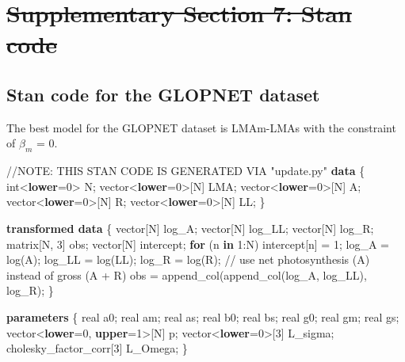 \documentclass[
  12pt,
  letterpaper,
  DIV=11,
  numbers=noendperiod]{scrartcl}
\newenvironment{Shaded}{\begin{snugshade}}{\end{snugshade}}
\newcommand{\AlertTok}[1]{\textcolor[rgb]{0.68,0.00,0.00}{#1}}
\newcommand{\CommentTok}[1]{\textcolor[rgb]{0.37,0.37,0.37}{#1}}
\newcommand{\ControlFlowTok}[1]{\textcolor[rgb]{0.00,0.23,0.31}{\textbf{#1}}}
\newcommand{\DataTypeTok}[1]{\textcolor[rgb]{0.68,0.00,0.00}{#1}}
\newcommand{\DecValTok}[1]{\textcolor[rgb]{0.68,0.00,0.00}{#1}}
\newcommand{\KeywordTok}[1]{\textcolor[rgb]{0.00,0.23,0.31}{\textbf{#1}}}
\newcommand{\NormalTok}[1]{\textcolor[rgb]{0.00,0.23,0.31}{#1}}
\numberwithin{equation}{section} %
\providecommand{\DIFdel}[1]{{\protect\color{red}\sout{#1}}}                      %
\providecommand{\DIFaddbegin}{} %
\providecommand{\DIFaddend}{} %
\providecommand{\DIFdelend}{} %
\newcommand{\DIFaddincludegraphics}[2][]{{\color{blue}\fbox{\DIFOincludegraphics[#1]{#2}}}} %
\DeclareRobustCommand{\DIFaddbegin}{\DIFOaddbegin \let\includegraphics\DIFaddincludegraphics} %
\DeclareRobustCommand{\DIFaddend}{\DIFOaddend \let\includegraphics\DIFOincludegraphics} %
\DeclareRobustCommand{\DIFdelend}{\DIFOaddend \let\includegraphics\DIFOincludegraphics} %
\begin{document}
\section{\DIFdel{Supplementary Section 7: Stan
code}}%
\addtocounter{section}{-1}%
\DIFdelend \DIFaddbegin \label{stan-code}
\DIFaddend 

\subsection{Stan code for the GLOPNET
dataset}\label{stan-code-for-the-glopnet-dataset}

The best model for the GLOPNET dataset is LMAm-LMAs with the constraint
of \(\beta_m\) = 0.

\begin{Shaded}
\begin{Highlighting}[]
\CommentTok{//}\AlertTok{NOTE}\CommentTok{: THIS STAN CODE IS GENERATED VIA "update.py"}
\KeywordTok{data}\NormalTok{ \{}
  \DataTypeTok{int}\NormalTok{\textless{}}\KeywordTok{lower}\NormalTok{=}\DecValTok{0}\NormalTok{\textgreater{} N;}
  \DataTypeTok{vector}\NormalTok{\textless{}}\KeywordTok{lower}\NormalTok{=}\DecValTok{0}\NormalTok{\textgreater{}[N] LMA;}
  \DataTypeTok{vector}\NormalTok{\textless{}}\KeywordTok{lower}\NormalTok{=}\DecValTok{0}\NormalTok{\textgreater{}[N] A;}
  \DataTypeTok{vector}\NormalTok{\textless{}}\KeywordTok{lower}\NormalTok{=}\DecValTok{0}\NormalTok{\textgreater{}[N] R;}
  \DataTypeTok{vector}\NormalTok{\textless{}}\KeywordTok{lower}\NormalTok{=}\DecValTok{0}\NormalTok{\textgreater{}[N] LL;}
\NormalTok{\}}

\KeywordTok{transformed data}\NormalTok{ \{}
  \DataTypeTok{vector}\NormalTok{[N] log\_A;}
  \DataTypeTok{vector}\NormalTok{[N] log\_LL;}
  \DataTypeTok{vector}\NormalTok{[N] log\_R;}
  \DataTypeTok{matrix}\NormalTok{[N, }\DecValTok{3}\NormalTok{] obs;}
  \DataTypeTok{vector}\NormalTok{[N] intercept;}
  \ControlFlowTok{for}\NormalTok{ (n }\ControlFlowTok{in} \DecValTok{1}\NormalTok{:N)}
\NormalTok{    intercept[n] = }\DecValTok{1}\NormalTok{;}
\NormalTok{  log\_A = log(A);}
\NormalTok{  log\_LL = log(LL);}
\NormalTok{  log\_R = log(R);}
  \CommentTok{// use net photosynthesis (A) instead of gross (A + R)}
\NormalTok{  obs = append\_col(append\_col(log\_A, log\_LL), log\_R);}
\NormalTok{\}}

\KeywordTok{parameters}\NormalTok{ \{}
  \DataTypeTok{real}\NormalTok{ a0;}
  \DataTypeTok{real}\NormalTok{ am;}
  \DataTypeTok{real}\NormalTok{ as;}
  \DataTypeTok{real}\NormalTok{ b0;}
  \DataTypeTok{real}\NormalTok{ bs;}
  \DataTypeTok{real}\NormalTok{ g0;}
  \DataTypeTok{real}\NormalTok{ gm;}
  \DataTypeTok{real}\NormalTok{ gs;}
  \DataTypeTok{vector}\NormalTok{\textless{}}\KeywordTok{lower}\NormalTok{=}\DecValTok{0}\NormalTok{, }\KeywordTok{upper}\NormalTok{=}\DecValTok{1}\NormalTok{\textgreater{}[N] p;}
  \DataTypeTok{vector}\NormalTok{\textless{}}\KeywordTok{lower}\NormalTok{=}\DecValTok{0}\NormalTok{\textgreater{}[}\DecValTok{3}\NormalTok{] L\_sigma;}
  \DataTypeTok{cholesky\_factor\_corr}\NormalTok{[}\DecValTok{3}\NormalTok{] L\_Omega;}
\NormalTok{\}}


\end{Highlighting}
\end{Shaded}
\end{document}
